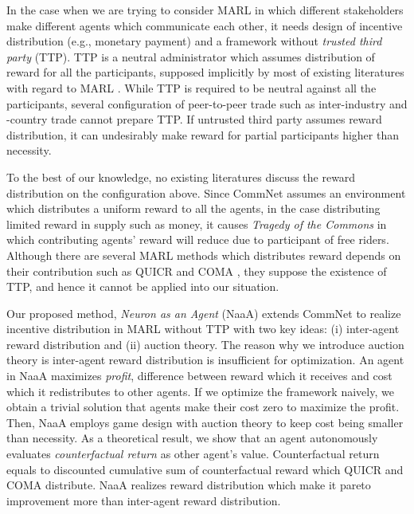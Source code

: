 In the case when we are trying to consider MARL in which different stakeholders make different agents which communicate each other, it needs design of incentive distribution (e.g., monetary payment) and a framework without {\em trusted third party} (TTP).
TTP is a neutral administrator which assumes distribution of reward for all the participants, supposed implicitly by most of existing literatures with regard to MARL \citep{agogino2006quicr,foerster2016learning,sukhbaatar2016learning}.
While TTP is required to be neutral against all the participants,
several configuration of peer-to-peer trade such as inter-industry and -country trade cannot prepare TTP.
If untrusted third party assumes reward distribution, it can undesirably make reward for partial participants higher than necessity.

To the best of our knowledge, no existing literatures discuss the reward distribution on the configuration above.
Since CommNet assumes an environment which distributes a uniform reward to all the agents, 
in the case distributing limited reward in supply such as money, it causes {\em Tragedy of the Commons} \citep{lloyd1833two} in which contributing agents' reward will reduce due to participant of free riders.
Although there are several MARL methods which distributes reward depends on their contribution such as QUICR \citep{agogino2006quicr} and COMA \citep{sukhbaatar2016learning}, they suppose the existence of TTP, and hence it cannot be applied into our situation.


Our proposed method, {\em Neuron as an Agent} (NaaA) extends CommNet to realize incentive distribution
in MARL without TTP with two key ideas: (i) inter-agent reward distribution and (ii) auction theory.
The reason why we introduce auction theory is inter-agent reward distribution is insufficient for optimization.
An agent in NaaA maximizes {\em profit}, difference between reward which it receives and cost which it redistributes to other agents.
If we optimize the framework naively, we obtain a trivial solution that agents make their cost zero to maximize the profit.
Then, NaaA employs game design with auction theory to keep cost being smaller than necessity.
As a theoretical result, we show that an agent autonomously evaluates {\em counterfactual return} as other agent's value.
Counterfactual return equals to discounted cumulative sum of counterfactual reward \citep{agogino2006quicr} which QUICR and COMA distribute.
NaaA realizes reward distribution which make it pareto improvement more than inter-agent reward distribution.

